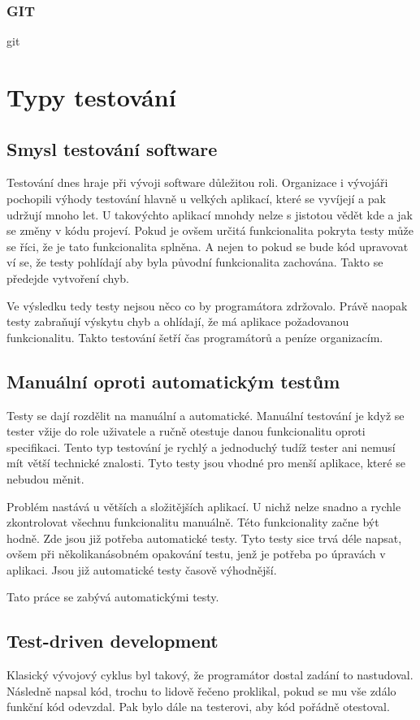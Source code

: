 \documentclass[czech,master,public,dept460,male,cpdeclaration,twoside]{diploma}
\begin{document}
\subsubsection{GIT}
git

\section{Typy testování}

\subsection{Smysl testování software}
Testování dnes hraje při vývoji software důležitou roli. Organizace i vývojáři pochopili výhody testování hlavně u velkých aplikací, které se vyvíjejí a pak udržují mnoho let. U takovýchto aplikací mnohdy nelze s jistotou vědět kde a jak se změny v kódu projeví. Pokud je ovšem určitá funkcionalita pokryta testy může se říci, že je tato funkcionalita splněna. A nejen to pokud se bude kód upravovat ví se, že testy pohlídají aby byla původní funkcionalita zachována. Takto se předejde vytvoření chyb.

Ve výsledku tedy testy nejsou něco co by programátora zdržovalo. Právě naopak testy zabraňují výskytu chyb a ohlídají, že má aplikace požadovanou funkcionalitu. Takto testování šetří čas programátorů a peníze organizacím.

\subsection{Manuální oproti automatickým testům}
Testy se dají rozdělit na manuální a automatické. Manuální testování je když se tester vžije do role uživatele a ručně otestuje danou funkcionalitu oproti specifikaci. Tento typ testování je rychlý a jednoduchý tudíž tester ani nemusí mít větší technické znalosti. Tyto testy jsou vhodné pro menší aplikace, které se nebudou měnit.

Problém nastává u větších a složitějších aplikací. U nichž nelze snadno a rychle zkontrolovat všechnu funkcionalitu manuálně. Této funkcionality začne být hodně. Zde jsou již potřeba automatické testy. Tyto testy sice trvá déle napsat, ovšem při několikanásobném opakování testu, jenž je potřeba po úpravách v aplikaci. Jsou již automatické testy časově výhodnější.

Tato práce se zabývá automatickými testy.

\subsection{Test-driven development}
Klasický vývojový cyklus byl takový, že programátor dostal zadání to nastudoval. Následně napsal kód, trochu to lidově řečeno proklikal, pokud se mu vše zdálo funkční kód odevzdal. Pak bylo dále na testerovi, aby kód pořádně otestoval.
\end{document}
